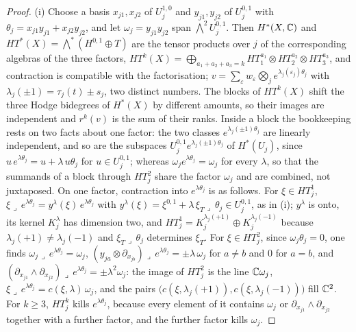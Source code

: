 \begin{proof}
(i) Choose a basis $x_{j1},x_{j2}$ of $U_{j}^{1,0}$ and $y_{j1},y_{j2}$ of
$U_{j}^{0,1}$ with $\theta_{j}=x_{j1}y_{j1}+x_{j2}y_{j2}$, and let
$\omega_{j}=y_{j1}y_{j2}$ span $\bigwedge^{2}U_{j}^{0,1}$. Then
$H^{*}(X,\mathbb{C})$ and $HT^{*}(X)=\bigwedge^{*}(H^{0,1}\oplus T)$ are the tensor
products over $j$ of the corresponding algebras of the three factors,
$HT^{k}(X)=\bigoplus_{a_{1}+a_{2}+a_{3}=k}HT^{a_{1}}_{1}\otimes HT^{a_{2}}_{2}
\otimes HT^{a_{3}}_{3}$, and contraction is compatible with the factorisation;
$v=\sum_{\varepsilon}w_{\varepsilon}\bigotimes_{j}e^{\lambda_{j}(\varepsilon_{j})\theta_{j}}$
with $\lambda_{j}(\pm1)=\tau_{j}(t)\pm s_{j}$, two distinct numbers. The blocks
of $HT^{k}(X)$ shift the three Hodge bidegrees of $H^{*}(X)$ by different
amounts, so their images are independent and $r^{k}(v)$ is the sum of their
ranks. Inside a block the bookkeeping rests on two facts about one factor:
the two classes $e^{\lambda_{j}(\pm1)\theta_{j}}$ are linearly independent,
and so are the subspaces $U_{j}^{0,1}e^{\lambda_{j}(\pm1)\theta_{j}}$ of
$H^{*}(U_{j})$, since $u\,e^{\lambda\theta_{j}}=u+\lambda\,u\theta_{j}$ for
$u\in U_{j}^{0,1}$; whereas $\omega_{j}e^{\lambda\theta_{j}}=\omega_{j}$ for
every $\lambda$, so that the summands of a block through $HT^{2}_{j}$ share the
factor $\omega_{j}$ and are combined, not juxtaposed. On one factor,
contraction into $e^{\lambda\theta_{j}}$ is as follows. For $\xi\in HT^{1}_{j}$,
$\xi\lrcorner\,e^{\lambda\theta_{j}}=y^{\lambda}(\xi)\,e^{\lambda\theta_{j}}$ with
$y^{\lambda}(\xi)=\xi^{0,1}+\lambda\,\xi_{T}\lrcorner\,\theta_{j}\in
U_{j}^{0,1}$, as in (i); $y^{\lambda}$ is onto, its kernel
$K^{\lambda}_{j}$ has dimension two, and
$HT^{1}_{j}=K^{\lambda_{j}(+1)}_{j}\oplus K^{\lambda_{j}(-1)}_{j}$ because
$\lambda_{j}(+1)\ne\lambda_{j}(-1)$ and $\xi_{T}\lrcorner\,\theta_{j}$
determines $\xi_{T}$. For $\xi\in HT^{2}_{j}$, since $\omega_{j}\theta_{j}=0$,
one finds $\omega_{j}\lrcorner\,e^{\lambda\theta_{j}}=\omega_{j}$,
$(y_{ja}\otimes\partial_{x_{jb}})\lrcorner\,e^{\lambda\theta_{j}}=\pm\lambda\,
\omega_{j}$ for $a\ne b$ and $0$ for $a=b$, and
$(\partial_{x_{j1}}\wedge\partial_{x_{j2}})\lrcorner\,e^{\lambda\theta_{j}}
=\pm\lambda^{2}\omega_{j}$: the image of $HT^{2}_{j}$ is the line
$\mathbb{C}\omega_{j}$, $\xi\lrcorner\,e^{\lambda\theta_{j}}=c(\xi,\lambda)\,\omega_{j}$,
and the pairs $\bigl(c(\xi,\lambda_{j}(+1)),c(\xi,\lambda_{j}(-1))\bigr)$ fill
$\mathbb{C}^{2}$. For $k\ge3$, $HT^{k}_{j}$ kills $e^{\lambda\theta_{j}}$, because
every element of it contains $\omega_{j}$ or $\partial_{x_{j1}}\wedge
\partial_{x_{j2}}$ together with a further factor, and the further factor
kills $\omega_{j}$.


\end{proof}
